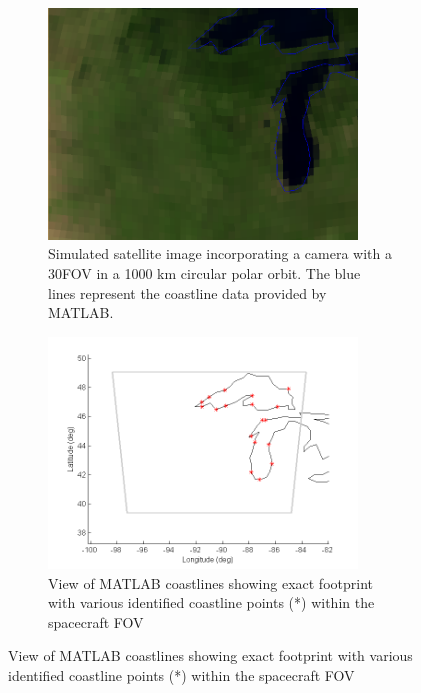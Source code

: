 \documentclass[]{aiaa-tc}%
\begin{document}
\begin{figure}[h!]
\centering
\begin{subfigure}{.48\textwidth}
  \centering
  \includegraphics[width=0.9\textwidth]{Michigan_sat}
  \caption{Simulated satellite image incorporating a camera with a 30\degree FOV in a 1000 km circular polar orbit.  The blue lines represent the coastline data provided by MATLAB.}
  \label{fig:satellite}
\end{subfigure}\hfill
\begin{subfigure}{.48\textwidth} 
  \centering
  \includegraphics[width=0.9\textwidth]{Michigan}
  \caption{View of MATLAB coastlines showing exact footprint with various identified coastline points (*) within the spacecraft FOV}
  \label{fig:coastline}
\end{subfigure}
\label{fig:matlabstuff}
\end{figure}
%
%
%
\end{document}
